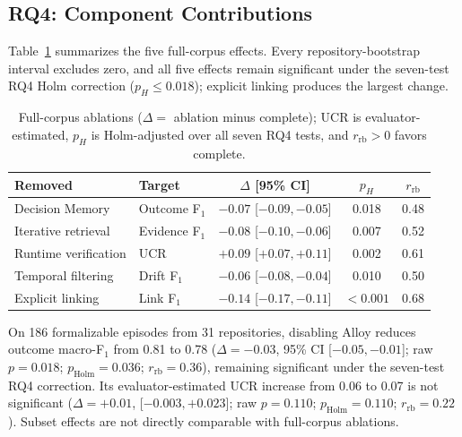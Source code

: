 \documentclass[10pt,conference]{IEEEtran}
\begin{document}
\subsection{RQ4: Component Contributions}
\label{subsec:results-rq4}
Table~\ref{tab:rq4-ablation} summarizes the five full-corpus effects. Every repository-bootstrap interval excludes zero, and all five effects remain significant under the seven-test RQ4 Holm correction ($p_H\leq0.018$); explicit linking produces the largest change.

\begin{table}[!b]
\caption{Full-corpus ablations ($\Delta=$ ablation minus complete); UCR is evaluator-estimated, $p_H$ is Holm-adjusted over all seven RQ4 tests, and $r_{\mathrm{rb}}>0$ favors complete.}
\label{tab:rq4-ablation}
\centering
\scriptsize
\renewcommand{\arraystretch}{1.03}
\setlength{\tabcolsep}{1.5pt}
\begin{tabularx}{\columnwidth}{@{}>{\raggedright\arraybackslash}Xlccc@{}}
\toprule
\textbf{Removed}&\textbf{Target}&\textbf{$\Delta$ [95\% CI]}&\textbf{$p_H$}&\textbf{$r_{\mathrm{rb}}$}\\
\midrule
Decision Memory&Outcome F$_1$&$-0.07$ [$-0.09,-0.05$]&0.018&0.48\\
Iterative retrieval&Evidence F$_1$&$-0.08$ [$-0.10,-0.06$]&0.007&0.52\\
Runtime verification&UCR&$+0.09$ [$+0.07,+0.11$]&0.002&0.61\\
Temporal filtering&Drift F$_1$&$-0.06$ [$-0.08,-0.04$]&0.010&0.50\\
Explicit linking&Link F$_1$&$-0.14$ [$-0.17,-0.11$]&$<0.001$&0.68\\
\bottomrule
\end{tabularx}
\end{table}
On 186 formalizable episodes from 31 repositories, disabling Alloy reduces outcome macro-F$_1$ from 0.81 to 0.78 ($\Delta=-0.03$, 95\% CI [$-0.05,-0.01$]; raw $p=0.018$; $p_{\mathrm{Holm}}=0.036$; $r_{\mathrm{rb}}=0.36$), remaining significant under the seven-test RQ4 correction. Its evaluator-estimated UCR increase from 0.06 to 0.07 is not significant ($\Delta=+0.01$, [$-0.003,+0.023$]; raw $p=0.110$; $p_{\mathrm{Holm}}=0.110$; $r_{\mathrm{rb}}=0.22$). Subset effects are not directly comparable with full-corpus ablations.
\end{document}
